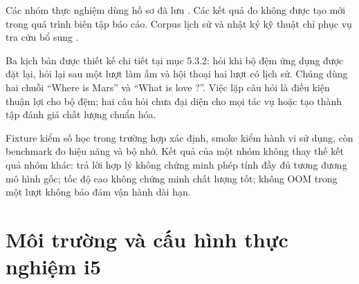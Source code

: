 Các nhóm thực nghiệm dùng hồ sơ đã lưu \cite{exp_phase1_i5,exp_web_session_i5,exp_prefill_i5,exp_ram_guard_i5,exp_smoke_validation,exp_phase1_i7}. Các kết quả đo không được tạo mới trong quá trình biên tập báo cáo. Corpus lịch sử và nhật ký kỹ thuật chỉ phục vụ tra cứu bổ sung \cite{moe_progress_matrix}.

Ba kịch bản được thiết kế chi tiết tại mục 5.3.2: hỏi khi bộ đệm ứng dụng được đặt lại, hỏi lại sau một lượt làm ấm và hội thoại hai lượt có lịch sử. Chúng dùng hai chuỗi “Where is Mars” và “What is love ?”. Việc lặp câu hỏi là điều kiện thuận lợi cho bộ đệm; hai câu hỏi chưa đại diện cho mọi tác vụ hoặc tạo thành tập đánh giá chất lượng chuẩn hóa.

Fixture kiểm số học trong trường hợp xác định, smoke kiểm hành vi sử dụng, còn benchmark đo hiệu năng và bộ nhớ. Kết quả của một nhóm không thay thế kết quả nhóm khác: trả lời hợp lý không chứng minh phép tính đầy đủ tương đương mô hình gốc; tốc độ cao không chứng minh chất lượng tốt; không OOM trong một lượt không bảo đảm vận hành dài hạn.

\section{Môi trường và cấu hình thực nghiệm i5}

